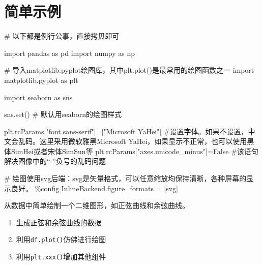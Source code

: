 \documentclass[
  letterpaper,
  DIV=11,
  numbers=noendperiod]{scrreprt}
\newenvironment{Shaded}{\begin{snugshade}}{\end{snugshade}}
\newcommand{\BuiltInTok}[1]{\textcolor[rgb]{0.00,0.23,0.31}{#1}}
\newcommand{\CommentTok}[1]{\textcolor[rgb]{0.37,0.37,0.37}{#1}}
\newcommand{\ImportTok}[1]{\textcolor[rgb]{0.00,0.46,0.62}{#1}}
\newcommand{\NormalTok}[1]{\textcolor[rgb]{0.00,0.23,0.31}{#1}}
\newcommand{\OperatorTok}[1]{\textcolor[rgb]{0.37,0.37,0.37}{#1}}
\newcommand{\StringTok}[1]{\textcolor[rgb]{0.13,0.47,0.30}{#1}}
\newcommand{\VariableTok}[1]{\textcolor[rgb]{0.07,0.07,0.07}{#1}}
\providecommand{\tightlist}{%
  \setlength{\itemsep}{0pt}\setlength{\parskip}{0pt}}\usepackage{longtable,booktabs,array}
\begin{document}
\hypertarget{ux7b80ux5355ux793aux4f8b}{%
\section{简单示例}\label{ux7b80ux5355ux793aux4f8b}}

\begin{Shaded}
\begin{Highlighting}[]
\CommentTok{\# 以下都是例行公事，直接拷贝即可}

\ImportTok{import}\NormalTok{ pandas }\ImportTok{as}\NormalTok{ pd}
\ImportTok{import}\NormalTok{ numpy }\ImportTok{as}\NormalTok{ np }

\CommentTok{\# 导入matplotlib.pyplot绘图库，其中plt.plot()是最常用的绘图函数之一}
\ImportTok{import}\NormalTok{ matplotlib.pyplot }\ImportTok{as}\NormalTok{ plt }

\ImportTok{import}\NormalTok{ seaborn }\ImportTok{as}\NormalTok{ sns}

\NormalTok{sns.}\BuiltInTok{set}\NormalTok{() }\CommentTok{\# 默认用seaborn的绘图样式}

\NormalTok{plt.rcParams[}\StringTok{"font.sans{-}serif"}\NormalTok{]}\OperatorTok{=}\NormalTok{[}\StringTok{"Microsoft YaHei"}\NormalTok{] }\CommentTok{\#设置字体。如果不设置，中文会乱码。这里采用微软雅黑\textquotesingle{}Microsoft YaHei\textquotesingle{}，如果显示不正常，也可以使用黑体\textquotesingle{}SimHei\textquotesingle{}或者宋体\textquotesingle{}SimSun\textquotesingle{}等}
\NormalTok{plt.rcParams[}\StringTok{"axes.unicode\_minus"}\NormalTok{]}\OperatorTok{=}\VariableTok{False} \CommentTok{\#该语句解决图像中的“{-}”负号的乱码问题}

\CommentTok{\# 绘图使用\textquotesingle{}svg\textquotesingle{}后端：svg是矢量格式，可以任意缩放均保持清晰，各种屏幕的显示良好。}
\OperatorTok{\%}\NormalTok{config InlineBackend.figure\_formats }\OperatorTok{=}\NormalTok{ [}\StringTok{\textquotesingle{}svg\textquotesingle{}}\NormalTok{]}
\end{Highlighting}
\end{Shaded}

从数据中简单绘制一个二维图形，如正弦曲线和余弦曲线。

\begin{enumerate}
\def\labelenumi{\arabic{enumi}.}
\tightlist
\item
  生成正弦和余弦曲线的数据
\item
  利用\texttt{df.plot()}仿佛进行绘图
\item
  利用\texttt{plt.xxx()}增加其他组件
\end{enumerate}
\end{document}
